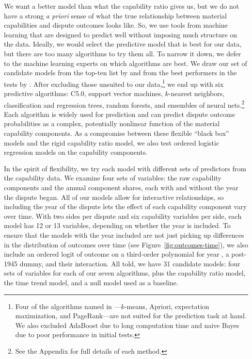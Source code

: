 We want a better model than what the capability ratio gives us, but we do not have a strong \emph{a priori} sense of what the true relationship between material capabilities and dispute outcomes looks like.
So, we use tools from machine learning that are designed to predict well without imposing much structure on the data.
Ideally, we would select the predictive model that is best for our data, but there are too many algorithms to try them all.
To narrow it down, we defer to the machine learning experts on which algorithms are best.
We draw our set of candidate models from the top-ten list by \citet{Wu:2007ev} and from the best performers in the tests by \citet{FernandezDelgado:2014ul}.
After excluding those unsuited to our data,\footnote{%
  Four of the algorithms named in \citet{Wu:2007ev}---$k$-means, Apriori, expectation maximization, and PageRank---are not suited for the prediction task at hand.
  We also excluded AdaBoost due to long computation time and naive Bayes due to poor performance in initial tests.
}
we end up with six predictive algorithms: C5.0, support vector machines, $k$-nearest neighbors, classification and regression trees, random forests, and ensembles of neural nets.\footnote{%
  See the Appendix for full details of each method.
}
Each algorithm is widely used for prediction and can predict dispute outcome probabilities as a complex, potentially nonlinear function of the material capability components.
As a compromise between these flexible ``black box'' models and the rigid capability ratio model, we also test ordered logistic regression models on the capability components.

In the spirit of flexibility, we try each model with different sets of predictors from the capability data.
We examine four sets of variables: the raw capability components and the annual component shares, each with and without the year the dispute began.
All of our models allow for interactive relationships, so including the year of
the dispute lets the effect of each capability component vary over time.
With two sides per dispute and six capability variables per side, each model has 12 or 13 variables, depending on whether the year is included.
To ensure that the models with the year included are not just picking up differences in the distribution of outcomes over time (see Figure~\ref{fig:outcomes-time}), we also include an ordered logit of outcome on a third-order polynomial for year \citep{Carter:2010dh}, a post-1945 dummy, and their interaction.
All told, we have 31 candidate models: four sets of variables for each of our seven algorithms, plus the capability ratio model, the time trend model, and a null model used as a baseline.

